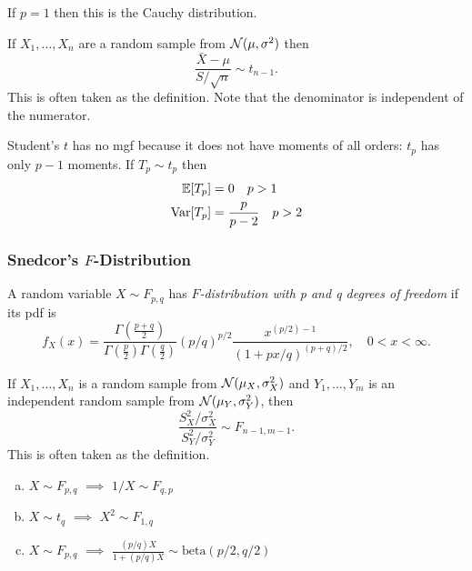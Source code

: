 If $p = 1$ then this is the Cauchy distribution.

\begin{remark}
    If $X_1, \dots, X_n$ are a random sample from $\mathcal{N}(\mu, \sigma^2)$ then
    \[
        \frac{\bar{X} - \mu}{S/\sqrt{n}} \sim t_{n-1}.
    \]
    This is often taken as the definition. Note that the denominator is independent of the numerator.
\end{remark}

\begin{lemma}
    Student's $t$ has no mgf because it does not have moments of all orders: $t_p$ has only $p-1$ moments. If $T_p \sim t_p$ then
    \begin{align*}
        \mathbb{E}{}[T_p] &= 0 \quad p > 1 \\
        \text{Var}{}[T_p] &= \frac{p}{p-2} \quad p > 2
    \end{align*}
\end{lemma}

\subsubsection{Snedcor's $F$-Distribution}

\begin{definition}
    A random variable $X \sim F_{p,q}$ has \emph{$F$-distribution with p and q degrees of freedom} if its pdf is
    \[
        f_X(x) = \frac{\Gamma\left(\frac{p+q}{2}\right)}{\Gamma\left(\frac p2 \right)\Gamma\left(\frac q2 \right)} (p/q)^{p/2} \frac{x^{(p/2) - 1}}{(1 + px/q)^{(p+q)/2}}, \quad 0 < x < \infty.
    \]
\end{definition}

\begin{remark}
    If $X_1, \dots, X_n$ is a random sample from $\mathcal{N}(\mu_X, \sigma_X^2)$ and $Y_1, \dots, Y_m$ is an independent random sample from $\mathcal{N}(\mu_Y, \sigma_Y^2)$, then
    \[
        \frac{S^2_X/\sigma^2_X}{S_Y^2/\sigma_Y^2} \sim F_{n-1, m-1}.
    \]
    This is often taken as the definition.
\end{remark}

\begin{theorem}
    \mbox{}
    \begin{enumerate}[a.]
        \item $X \sim F_{p,q} \,\, \implies \,\, 1/X \sim F_{q,p}$
        \item $X \sim t_q \,\, \implies \,\, X^2 \sim F_{1,q}$
        \item $X \sim F_{p,q} \,\, \implies \,\, \frac{(p/q)X}{1 + (p/q)X} \sim \text{beta}(p/2, q/2)$
    \end{enumerate}
\end{theorem}

